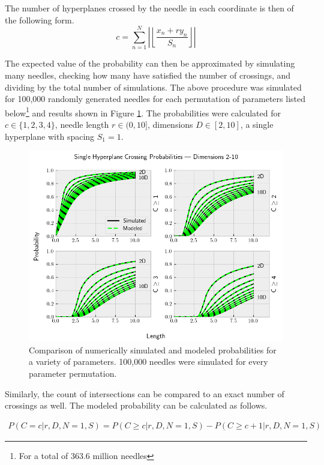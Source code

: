 \documentclass{article}
\begin{document}
The number of hyperplanes crossed by the needle in each coordinate is then of the following form.
\begin{equation}
	c = \sum_{n=1}^{N} \left|\left\lfloor \frac{x_n+r y_n}{S_n} \right\rfloor\right|
\end{equation}

The expected value of the probability can then be approximated by simulating many needles, checking
how many have satisfied the number of crossings, and dividing by the total number of simulations.
The above procedure was simulated for 100,000 randomly generated needles for each permutation of parameters
listed below\footnote{For a total of 363.6 million needles} and results shown in Figure \ref{fig:numeric sim N1}. The probabilities were calculated for
$c\in\{1,2,3,4\}$, needle length $r\in(0, 10]$, dimensions $D\in[2, 10]$, a single hyperplane with
spacing $S_1=1$.

\begin{figure}
	\centerline{\includegraphics[width=5in]{numeric_sim_N1.png}}
	\caption{Comparison of numerically simulated and modeled probabilities for a variety of parameters.
	100,000 needles were simulated for every parameter permutation.}
	\label{fig:numeric sim N1}
\end{figure}

Similarly, the count of intersections can be compared to an exact number of crossings as well. The modeled
probability can be calculated as follows.

\begin{gather}
	P(C=c|r, D, N=1, S) = P(C\ge c|r, D, N=1, S) - P(C\ge c+1|r, D, N=1, S)
\end{gather}
\end{document}
